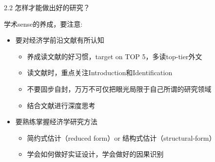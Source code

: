 \documentclass[10pt,aspectratio=43,mathserif,table]{beamer}
\begin{document}
\begin{frame}{\small 2.2 怎样才能做出好的研究？}
	
	\begin{block}{\footnotesize 学术sense的养成，要注意:}
		\vspace{0.7em}
		
		\begin{itemize}
			\item \footnotesize 要对经济学前沿文献有所认知
			
			\begin{itemize}
				\item \footnotesize 养成读文献的好习惯，target on TOP 5，多读top-tier外文
			\end{itemize}
			
			\begin{itemize}
				\item \footnotesize 读文献时，重点关注Introduction和Identification
			\end{itemize}
			
			\begin{itemize}
				\item \footnotesize 不要固步自封，万万不可仅把眼光局限于自己所谓的研究领域
			\end{itemize}
			
			\begin{itemize}
				\item \footnotesize 结合文献进行深度思考
			\end{itemize}
			
			\vspace{0.7em}
			
			\item \footnotesize 要熟练掌握经济学研究方法
			
			\begin{itemize}
				\item \footnotesize 简约式估计（reduced form）or  结构式估计（structural-form）
			\end{itemize}
			
			\begin{itemize}
				\item \footnotesize 学会如何做好实证设计，学会做好的因果识别
			\end{itemize}
				
			

			\vspace{0.7em}
			

\end{itemize}
\end{block}
\end{frame}
\end{document}
